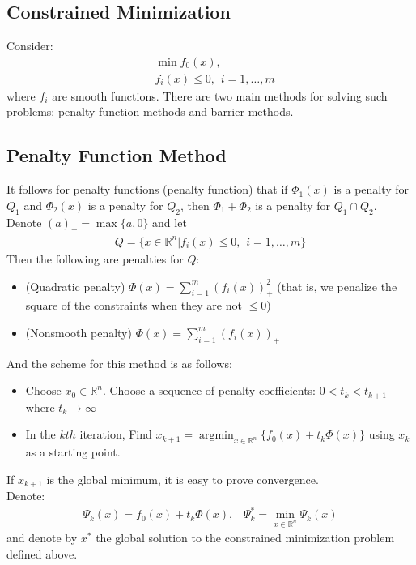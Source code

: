 \documentclass[12pt,a4paper]{article}
\DeclareMathOperator*{\argmin}{argmin}
\begin{document}
	\subsection*{Constrained Minimization}
	Consider:
	\begin{align*}
		&\min f_0(x), \\
		&f_i(x) \leq 0, \hspace{5pt} i=1, \ldots, m
	\end{align*}
	where $f_i$ are smooth functions. There are two main methods for solving such problems: penalty function methods and barrier methods. 
	\subsection*{Penalty Function Method}
	It follows for penalty functions (\hyperref[sec:Def]{penalty function}) that if $\Phi_1(x)$ is a penalty for $Q_1$ and $\Phi_2(x)$ is a penalty for $Q_2$, then $\Phi_1 + \Phi_2$ is a penalty for $Q_1 \cap Q_2$. \\
	Denote $(a)_+ = \max\{a,0\}$ and let
	\begin{align*}
		Q = \{x \in \mathbb{R}^n | f_i(x) \leq 0, \hspace{5pt} i=1, \ldots , m\}
	\end{align*}
	Then the following are penalties for $Q$:
	\begin{itemize}
		\item (Quadratic penalty) $\Phi(x) = \sum_{i=1}^{m}(f_i(x))^2_+$ (that is, we penalize the square of the constraints when they are not $\leq 0$)
		\item (Nonsmooth penalty) $\Phi(x) = \sum_{i=1}^{m}(f_i(x))_+$
	\end{itemize}
	And the scheme for this method is as follows:
	\begin{itemize}
		\item Choose $x_0 \in \mathbb{R}^n$. Choose a sequence of penalty coefficients: $0 < t_k < t_{k+1}$ where $t_k \rightarrow \infty$
		\item In the $kth$ iteration, Find $x_{k+1} = \argmin_{x \in \mathbb{R}^n}\{f_0(x) + t_k \Phi(x)\}$ using $x_k$ as a starting point.
	\end{itemize}
	If $x_{k+1}$ is the global minimum, it is easy to prove convergence. \\
	Denote:
	\begin{align*}
		\Psi_k(x) = f_0(x) + t_k\Phi(x), \hspace{10pt} \Psi_k^* = \min_{x \in \mathbb{R}^n}\Psi_k(x)
	\end{align*}
	and denote by $x^*$ the global solution to the constrained minimization problem defined above. 
\end{document}
